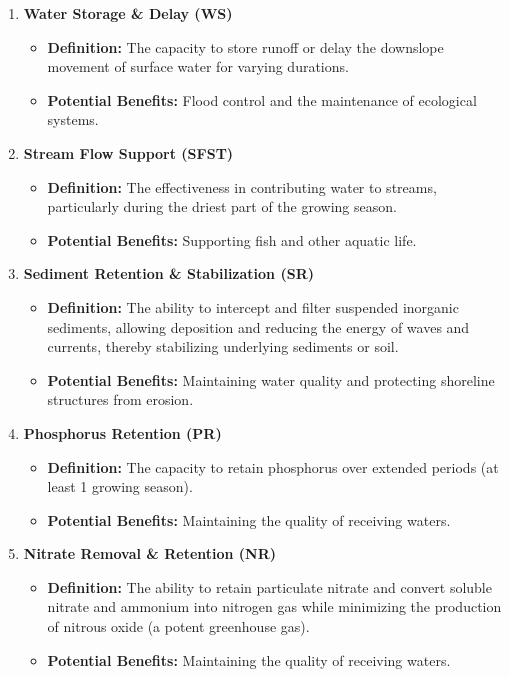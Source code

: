 \documentclass[12pt,letterpaper]{article}
\begin{document}
\begin{enumerate}
    \item \textbf{Water Storage \& Delay (WS)}
    \begin{itemize}
        \item \textbf{Definition:} The capacity to store runoff or delay the downslope movement of surface water for varying durations.
        \item \textbf{Potential Benefits:} Flood control and the maintenance of ecological systems.
    \end{itemize}
    \item \textbf{Stream Flow Support (SFST)}
    \begin{itemize}
        \item \textbf{Definition:} The effectiveness in contributing water to streams, particularly during the driest part of the growing season.
        \item \textbf{Potential Benefits:} Supporting fish and other aquatic life.
    \end{itemize}
    \item \textbf{Sediment Retention \& Stabilization (SR)}
    \begin{itemize}
        \item \textbf{Definition:} The ability to intercept and filter suspended inorganic sediments, allowing deposition and reducing the energy of waves and currents, thereby stabilizing underlying sediments or soil.
        \item \textbf{Potential Benefits:} Maintaining water quality and protecting shoreline structures from erosion.
    \end{itemize}
    \item \textbf{Phosphorus Retention (PR)}
    \begin{itemize}
        \item \textbf{Definition:} The capacity to retain phosphorus over extended periods (at least 1 growing season).
        \item \textbf{Potential Benefits:} Maintaining the quality of receiving waters.
    \end{itemize}
    \item \textbf{Nitrate Removal \& Retention (NR)}
    \begin{itemize}
        \item \textbf{Definition:} The ability to retain particulate nitrate and convert soluble nitrate and ammonium into nitrogen gas while minimizing the production of nitrous oxide (a potent greenhouse gas).
        \item \textbf{Potential Benefits:} Maintaining the quality of receiving waters.
    \end{itemize}
\end{enumerate}
\end{document}
